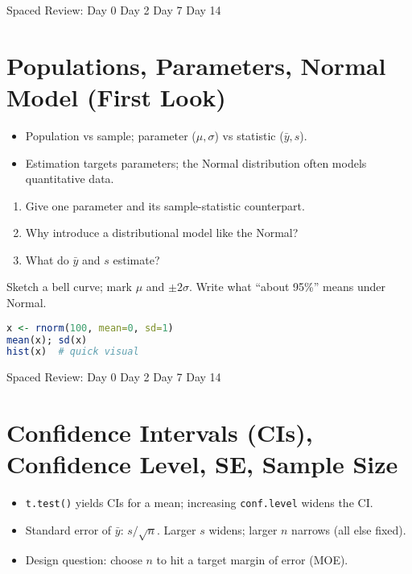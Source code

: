 \documentclass[11pt,a4paper]{article}
\def\textbf#1{#1}%
\newcommand{\reviewticks}{
  \vspace{0.4em}
  \noindent\scriptsize\textbf{Spaced Review:}
  \fbox{\phantom{D0}} Day 0\quad
  \fbox{\phantom{D2}} Day 2\quad
  \fbox{\phantom{D7}} Day 7\quad
  \fbox{\phantom{D14}} Day 14
}
\begin{document}
\reviewticks

\section{Populations, Parameters, Normal Model (First Look)}

\begin{corebox}
\begin{itemize}
  \item \textbf{Population vs sample}; \textbf{parameter} (\(\mu,\sigma\)) vs \textbf{statistic} (\(\bar{y}, s\)).
  \item Estimation targets parameters; the \textbf{Normal} distribution often models quantitative data.
\end{itemize}
\end{corebox}

\begin{recallbox}
\begin{enumerate}
  \item Give one parameter and its sample-statistic counterpart.
  \item Why introduce a distributional model like the Normal?
  \item What do \(\bar{y}\) and \(s\) estimate?
\end{enumerate}
\end{recallbox}

\begin{practicebox}
Sketch a bell curve; mark \(\mu\) and \(\pm 2\sigma\). Write what ``about 95\%'' means under Normal.
\end{practicebox}

\begin{rbox}
\begin{lstlisting}[language=R]
x <- rnorm(100, mean=0, sd=1)
mean(x); sd(x)
hist(x)  # quick visual
\end{lstlisting}
\end{rbox}

\reviewticks

\section{Confidence Intervals (CIs), Confidence Level, SE, Sample Size}

\begin{corebox}
\begin{itemize}
  \item \texttt{t.test()} yields CIs for a mean; increasing \texttt{conf.level} widens the CI.
  \item Standard error of \(\bar{y}\): \( s/\sqrt{n} \). Larger \(s\) widens; larger \(n\) narrows (all else fixed).
  \item Design question: choose \(n\) to hit a target margin of error (MOE).
\end{itemize}
\end{corebox}
\end{document}
